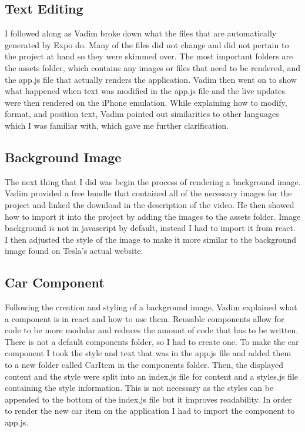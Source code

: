 \documentclass[10pt,twocolumn]{article}
\begin{document}
\subsection{Text Editing}

    I followed along as Vadim broke down what the files that are automatically generated by Expo do. Many of the files did not change and did not pertain to the project at hand so they were skimmed over. The most important folders are the assets folder, which contains any images or files that need to be rendered, and the app.js file that actually renders the application. Vadim then went on to show what happened when text was modified in the app.js file and the live updates were then rendered on the iPhone emulation. While explaining how to modify, format, and position text, Vadim pointed out similarities to other languages which I was familiar with, which gave me further clarification. 

\subsection{Background Image}
    The next thing that I did was begin the process of rendering a background image. Vadim provided a free bundle that contained all of the necessary images for the project and linked the download in the description of the video. He then showed how to import it into the project by adding the images to the assets folder. Image background is not in javascript by default, instead I had to import it from react. I then adjusted the style of the image to make it more similar to the background image found on Tesla’s actual website. 
    
\subsection{Car Component}
    Following the creation and styling of a background image, Vadim explained what a component is in react and how to use them. Reusable components allow for code to be more modular and reduces the amount of code that has to be written. There is not a default components folder, so I had to create one. To make the car component I took the style and text that was in the app.js file and added them to a new folder called CarItem in the components folder. Then, the displayed content and the style were split into an index.js file for content and a styles.js file containing the style information. This is not necessary as the styles can be appended to the bottom of the index.js file but it improves readability. In order to render the new car item on the application I had to import the component to app.js. 
\end{document}
